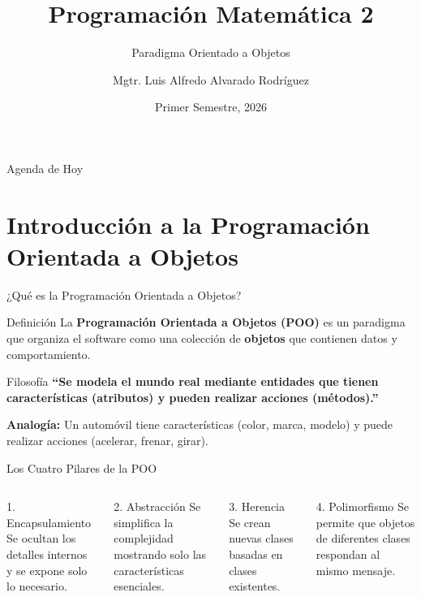 \documentclass[aspectratio=169]{beamer}
\title[PM2]{Programación Matemática 2}
\subtitle{Paradigma Orientado a Objetos}
\author[Luis Alfredo Alvarado]{Mgtr. Luis Alfredo Alvarado Rodríguez}
\institute[ECFM - USAC]{
    Escuela de Ciencias Físicas y Matemáticas \\
    Universidad de San Carlos de Guatemala
}
\date{Primer Semestre, 2026}
\begin{document}
\begin{frame}
    \titlepage
\end{frame}

\begin{frame}{Agenda de Hoy}
    \tableofcontents
\end{frame}

\section{Introducción a la Programación Orientada a Objetos}

\begin{frame}{¿Qué es la Programación Orientada a Objetos?}
    \begin{block}{Definición}
        La \textbf{Programación Orientada a Objetos (POO)} es un paradigma que organiza el software como una colección de \textbf{objetos} que contienen datos y comportamiento.
    \end{block}
    \vspace{0.5cm}
    
    \begin{alertblock}{Filosofía}
        \textbf{``Se modela el mundo real mediante entidades que tienen características (atributos) y pueden realizar acciones (métodos).''}
    \end{alertblock}
    \vspace{0.3cm}
    
    \textbf{Analogía:} Un automóvil tiene características (color, marca, modelo) y puede realizar acciones (acelerar, frenar, girar).
\end{frame}

\begin{frame}{Los Cuatro Pilares de la POO}
    \begin{columns}[t]
        \begin{block}{1. Encapsulamiento}
            Se ocultan los detalles internos y se expone solo lo necesario.
        \end{block}
        \vspace{0.3cm}
        \begin{block}{2. Abstracción}
            Se simplifica la complejidad mostrando solo las características esenciales.
        \end{block}
        
        \begin{block}{3. Herencia}
            Se crean nuevas clases basadas en clases existentes.
        \end{block}
        \vspace{0.3cm}
        \begin{block}{4. Polimorfismo}
            Se permite que objetos de diferentes clases respondan al mismo mensaje.
        \end{block}
    \end{columns}
\end{frame}
\end{document}

